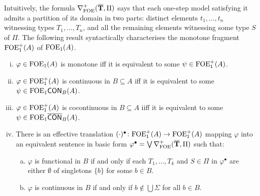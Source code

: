 Intuitively, the formula $\nabla^+_{\mathrm{FOE}}(\overline{{\mathbf{T}}},\Pi)$ says that each one-step model satisfying it admits a partition of its domain in two parts: distinct elements $t_1,\dots,t_n$ witnessing types $T_1,\dots,T_n$, and all the remaining elements witnessing some type $S$ of $\Pi$. The following result syntactically characterises the monotone fragment $\mathrm{FOE}_1^+(A)$ of $\mathrm{FOE}_1(A)$.


\begin{theorem} \label{th:ofoe-normalforms} 
\begin{enumerate}[(i)]
\item $\varphi  \in \mathrm{FOE}_1(A)$ is monotone iff it is equivalent to some $\psi \in \mathrm{FOE}_1^{+}(A)$. 
\item $\varphi  \in \mathrm{FOE}_1^{+}(A)$ is continuous in $B \subseteq A$ iff it is equivalent to some $\psi \in\mathrm{FOE}_1\mathsf{CON}_{B}(A)$. 
\item $\varphi  \in \mathrm{FOE}_1^{+}(A)$ is cocontinuous in $B \subseteq A$ iiff it is equivalent to some $\psi \in\mathrm{FOE}_1\overline{\mathsf{CON}}_{B}(A)$. 
\item There is an effective translation $(\cdot)^{\bullet} \colon \mathrm{FOE}_1^{+}(A) \to \mathrm{FOE}_1^{+}(A)$ mapping $\varphi$ into an equivalent sentence in basic form $\varphi^{\bullet} = \bigvee \nabla^+_{\mathrm{FOE}}(\overline{{\mathbf{T}}},\Pi)$ such that:
\begin{enumerate}[(a)]
\item $\varphi$ is functional in $B$ if and only if each $T_1, \dots, T_k$ and $S \in \Pi$ in $\varphi^{\bullet}$ are either $\emptyset$ of singletons $\{b\}$ for some $b \in B$.
\item $\varphi$ is continuous in $B$ if and only if $b\notin \bigcup\Sigma$ for all $b \in B$.
\end{enumerate}
\end{enumerate}
\end{theorem}



